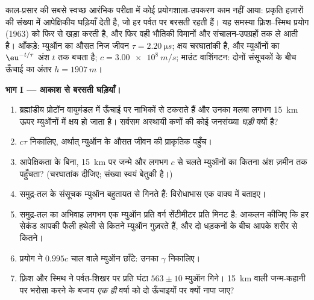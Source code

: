 \begin{problem}[{सप्ताहांत समस्या --- म्युऑन, पर्वत की घड़ियाँ और
यह प्रमाण कि काल प्रसारित होता है}]\label{pb:b3:relativistic-kinematics:1}
काल-प्रसार की सबसे स्वच्छ आरंभिक परीक्षा में कोई प्रयोगशाला-उपकरण
काम नहीं आया: प्रकृति हज़ारों की संख्या में आपेक्षिकीय घड़ियाँ देती है,
जो हर पर्वत पर बरसती रहती हैं। यह समस्या फ़्रिश--स्मिथ प्रयोग (1963)
को फिर से खड़ा करती है, और फिर वही भौतिकी विमानों और
संचालन-उपग्रहों तक ले आती है। आँकड़े: म्युऑन का औसत निज जीवन $\tau =
\qty{2.20}{\micro s}$; क्षय चरघातांकी है, और म्युऑनों का
$\eu^{-t/\tau}$ अंश  $t$ तक बचता है; $c =
\qty{3.00e8}{m/s}$; माउंट वाशिंगटन: दोनों संसूचकों के बीच ऊँचाई का अंतर $h =
\qty{1907}{m}$।

\medskip\noindent\textbf{भाग I --- आकाश से बरसती घड़ियाँ।}
\begin{enumerate}
  \item ब्रह्मांडीय प्रोटॉन वायुमंडल में ऊँचाई पर नाभिकों से टकराते
        हैं और उनका मलबा लगभग \qty{15}{km} ऊपर म्युऑनों में क्षय हो
        जाता है। सर्वसम अस्थायी कणों की कोई जनसंख्या
        \emph{घड़ी} क्यों है?
  \item $c\tau$ निकालिए, अर्थात् म्युऑन के औसत जीवन की प्राकृतिक पहुँच।
  \item आपेक्षिकता के बिना, \qty{15}{km} पर जन्मे और लगभग
        $c$ से चलते म्युऑनों का कितना अंश ज़मीन तक पहुँचता?
        (चरघातांक दीजिए; संख्या स्वयं बेतुकी है।)
  \item समुद्र-तल के संसूचक म्युऑन बहुतायत से गिनते हैं: विरोधाभास
        एक वाक्य में बताइए।
  \item समुद्र-तल का अभिवाह लगभग एक म्युऑन प्रति वर्ग सेंटीमीटर प्रति
        मिनट है: आकलन कीजिए कि हर सेकंड आपकी फैली हथेली से कितने
        म्युऑन गुज़रते हैं, और दो धड़कनों के बीच आपके शरीर से कितने।
  \item प्रयोग ने $0.995c$ चाल वाले म्युऑन छाँटे: उनका
        $\gamma$ निकालिए।
  \item फ़्रिश और स्मिथ ने पर्वत-शिखर पर प्रति घंटा $563 \pm 10$
        म्युऑन गिने। \qty{15}{km} वाली जन्म-कहानी पर भरोसा करने के
        बजाय \emph{एक ही} वर्षा को दो ऊँचाइयों पर क्यों नापा जाए?
\end{enumerate}


\end{problem}
